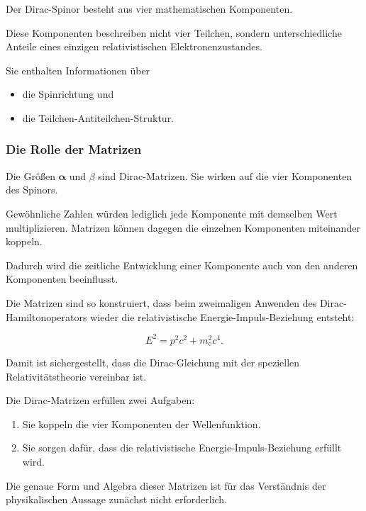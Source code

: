 \begin{DidacticBox}
	\label{box:vier_komponenten_ein_elektron}
	
	Der Dirac-Spinor besteht aus vier mathematischen Komponenten.
	
	Diese Komponenten beschreiben nicht vier Teilchen, sondern
	unterschiedliche Anteile eines einzigen relativistischen
	Elektronenzustandes.
	
	Sie enthalten Informationen über
	
	\begin{itemize}
		\item die Spinrichtung und
		\item die Teilchen-Antiteilchen-Struktur.
	\end{itemize}
\end{DidacticBox}

\subsubsection*{Die Rolle der Matrizen}

Die Größen \(\boldsymbol{\alpha}\) und \(\beta\) sind
Dirac-Matrizen. Sie wirken auf die vier
Komponenten des Spinors.

Gewöhnliche Zahlen würden lediglich jede Komponente mit demselben Wert
multiplizieren. Matrizen können dagegen die einzelnen Komponenten
miteinander koppeln.

Dadurch wird die zeitliche Entwicklung einer Komponente auch von den
anderen Komponenten beeinflusst.

Die Matrizen sind so konstruiert, dass beim zweimaligen Anwenden des
Dirac-Hamiltonoperators wieder die relativistische
Energie-Impuls-Beziehung entsteht:

\begin{equation}
	E^2
	=
	p^2c^2
	+
	m_{\mathrm e}^2c^4.
	\label{eq:energie_impuls_aus_diracgleichung}
\end{equation}

Damit ist sichergestellt, dass die Dirac-Gleichung mit der speziellen
Relativitätstheorie vereinbar ist.

\begin{MathBox}
	\label{box:aufgabe_dirac_matrizen}
	
	Die Dirac-Matrizen erfüllen zwei Aufgaben:
	
	\begin{enumerate}
		\item Sie koppeln die vier Komponenten der Wellenfunktion.
		\item Sie sorgen dafür, dass die relativistische
		Energie-Impuls-Beziehung erfüllt wird.
	\end{enumerate}
	
	Die genaue Form und Algebra dieser Matrizen ist für das Verständnis der
	physikalischen Aussage zunächst nicht erforderlich.
\end{MathBox}

